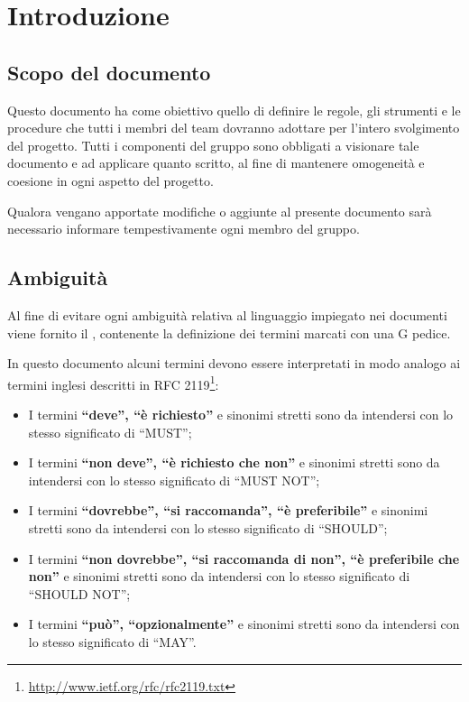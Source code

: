 \section{Introduzione}

\subsection{Scopo del documento}

Questo documento ha come obiettivo quello di definire le regole, gli strumenti e le procedure che tutti i membri del team dovranno adottare per l'intero svolgimento del progetto. Tutti i componenti del gruppo sono obbligati a visionare tale documento e ad applicare quanto scritto, al fine di mantenere omogeneità e coesione in ogni aspetto del progetto.

Qualora vengano apportate modifiche o aggiunte al presente documento sarà necessario informare tempestivamente ogni membro del gruppo.

\subsection{Ambiguità}

Al fine di evitare ogni ambiguità relativa al linguaggio impiegato nei documenti viene fornito il \Glossario{}, contenente la definizione dei termini marcati con una G pedice.

In questo documento alcuni termini devono essere interpretati in modo analogo ai termini inglesi descritti in RFC 2119\footnote{\url{http://www.ietf.org/rfc/rfc2119.txt}}:
\begin{itemize}
 \item I termini \textbf{``deve'', ``è richiesto''} e sinonimi stretti sono da intendersi con lo stesso significato di ``MUST'';
 \item I termini \textbf{``non deve'', ``è richiesto che non''} e sinonimi stretti sono da intendersi con lo stesso significato di ``MUST NOT'';
 \item I termini \textbf{``dovrebbe'', ``si raccomanda'', ``è preferibile''} e sinonimi stretti sono da intendersi con lo stesso significato di ``SHOULD'';
 \item I termini \textbf{``non dovrebbe'', ``si raccomanda di non'', ``è preferibile che non''} e sinonimi stretti sono da intendersi con lo stesso significato di ``SHOULD NOT'';
 \item I termini \textbf{``può'', ``opzionalmente''} e sinonimi stretti sono da intendersi con lo stesso significato di ``MAY''.
\end{itemize}

